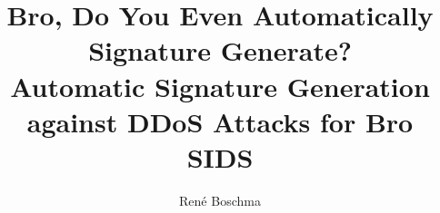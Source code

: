 \documentclass{libs/sig-alternate}
\begin{document}
\title{Bro, Do You Even Automatically Signature Generate?\\
  \large Automatic Signature Generation against DDoS Attacks for Bro SIDS}

\author{
\alignauthor
	René Boschma\\
    \\
}


\maketitle


	

%






\newpage

\end{document}

